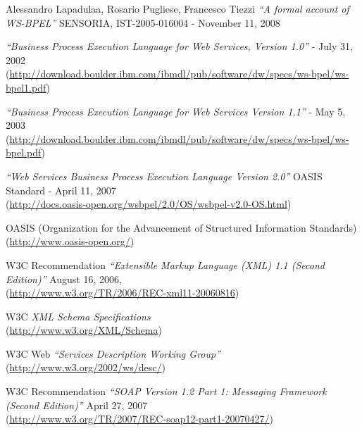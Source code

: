 \begin{thebibliography}{99}

 Alessandro Lapadulaa, Rosario Pugliese, Francesco
Tiezzi \emph{``A formal account of WS-BPEL''} SENSORIA, IST-2005-016004
- November 11, 2008

 \emph{``Business Process Execution Language for Web Services,
Version 1.0''} - July 31, 2002 \\
(\href{http://download.boulder.ibm.com/ibmdl/pub/software/dw/specs/ws-bpel/ws-bpel1.pdf}{http://download.boulder.ibm.com/ibmdl/pub/software/dw/specs/ws-bpel/ws-bpel1.pdf})

 \emph{``Business Process Execution Language for Web
Services Version 1.1''} - May 5, 2003 \\
(\href{http://download.boulder.ibm.com/ibmdl/pub/software/dw/specs/ws-bpel/ws-bpel.pdf}{http://download.boulder.ibm.com/ibmdl/pub/software/dw/specs/ws-bpel/ws-bpel.pdf})

 \emph{``Web Services Business Process Execution Language
Version 2.0''} OASIS Standard - April 11, 2007 \\
(\href{http://docs.oasis-open.org/wsbpel/2.0/OS/wsbpel-v2.0-OS.html}{http://docs.oasis-open.org/wsbpel/2.0/OS/wsbpel-v2.0-OS.html})

 OASIS (Organization for the Advancement of Structured
Information Standards)\\
(\href{http://www.oasis-open.org/}{http://www.oasis-open.org/})

 W3C Recommendation \emph{``Extensible Markup Language (XML) 1.1
(Second Edition)''} August 16, 2006,\\
(\href{http://www.w3.org/TR/2006/REC-xml11-20060816}{http://www.w3.org/TR/2006/REC-xml11-20060816})

 W3C \emph{XML Schema Specifications}\\
(\href{http://www.w3.org/XML/Schema}{http://www.w3.org/XML/Schema})

 W3C Web \emph{``Services Description Working Group''}\\
(\href{http://www.w3.org/2002/ws/desc/}{http://www.w3.org/2002/ws/desc/})

 W3C Recommendation \emph{``SOAP Version 1.2 Part 1: Messaging
Framework (Second Edition)''} April 27, 2007\\
(\href{http://www.w3.org/TR/2007/REC-soap12-part1-20070427/}{http://www.w3.org/TR/2007/REC-soap12-part1-20070427/})


\end{thebibliography}
